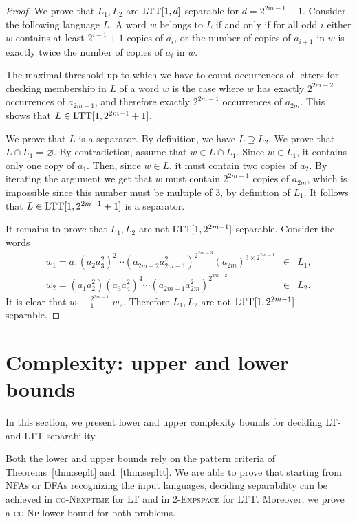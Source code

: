 \documentclass{LMCS}
\newcommand{\lt}{\textup{LT}\xspace}
\newcommand{\ltt}{\textup{LTT}\xspace}
\newcommand\ltteq[2]{\ensuremath{\equiv_{#1}^{#2}}\xspace}
\theoremstyle{plain}
\begin{document}
\begin{proof}
  We prove that $L_1,L_2$ are $\ltt[1,d]$-separable for $d =
  2^{2m-1}+1$. Consider the following language $L$. A word $w$ belongs
  to $L$ if and only if for all odd $i$ either $w$ contains at least
  $2^{i-1}+1$ copies of $a_i$, or the number of copies of $a_{i+1}$ in
  $w$ is exactly twice the number of copies of $a_i$ in $w$.

  The maximal threshold up to which we have to count occurrences of
  letters for checking membership in $L$ of a word $w$ is the case
  where $w$ has exactly $2^{2m-2}$ occurrences of $a_{2m-1}$, and
  therefore exactly $2^{2m-1}$ occurrences of $a_{2m}$. This shows
  that $L \in \ltt[1,2^{2m-1}+1]$.

  We prove that $L$ is a separator. By definition, we have $L
  \supseteq L_2$. We prove that $L \cap L_1 = \varnothing$. By
  contradiction, assume that $w \in L \cap L_1$. Since $w \in L_1$, it
  contains only one copy of $a_1$. Then, since $w \in L$, it must
  contain two copies of $a_2$. By iterating the argument we get that
  $w$ must contain $2^{2m-1}$ copies of $a_{2m}$, which is impossible
  since this number must be multiple of $3$, by definition of $L_1$. It
  follows that $L \in \ltt[1,2^{2m-1}+1]$ is a separator.

  It remains to prove that $L_1,L_2$ are not
  $\ltt[1,2^{2m-1}]$-separable. Consider the words 
  \[
  \begin{array}{lcl}
    w_1 = a^{}_1(a_2a_3^2)^2 \cdots (a_{2m-2}^{}a_{2m-1}^2)^{2^{2m-3}} (a_{2m})^{3
      \times 2^{2m-1}} & \in & L_1, \\
    w_2 = (a^{}_1a_2^2)(a^{}_3a_4^2)^4 \cdots (a^{}_{2m-1}a_{2m}^2)^{2^{2m-2}}  & \in & L_2.
  \end{array}
\]
  It is clear that $w_1 \ltteq{1}{2^{2m-1}} w_2$. Therefore $L_1,L_2$
  are not $\ltt[1,2^{2m-1}]$-separable.
\end{proof}



\section{Complexity: upper and lower bounds}
\label{sec:comp}
\makeatletter{}In this section, we present lower and upper complexity bounds for
deciding \lt- and \ltt-separability.

Both the lower and upper bounds rely on the pattern criteria of
Theorems~\ref{thm:seplt} and~\ref{thm:sepltt}. We are able to prove
that starting from NFAs or DFAs recognizing the input languages,
deciding separability can be achieved in \textsc{co-Nexptime} for \lt
and in \textsc{2-Expspace} for \ltt. Moreover, we prove a
\textsc{co-Np} lower bound for both problems. 
\end{document}
